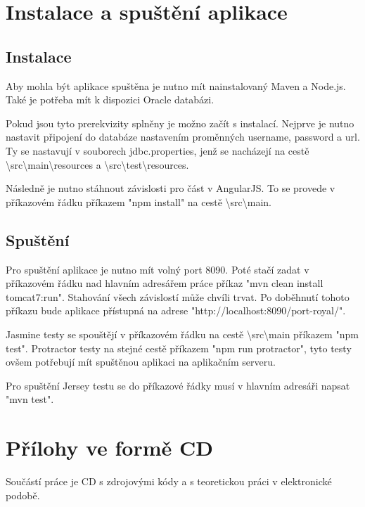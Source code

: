 \documentclass[czech,master,public,dept460,male,cpdeclaration,twoside]{diploma}
\begin{document}
\appendix
\section{Instalace a spuštění aplikace}

\subsection{Instalace}
Aby mohla být aplikace spuštěna je nutno mít nainstalovaný Maven a Node.js. Také je potřeba mít k dispozici Oracle databázi.

Pokud jsou tyto prerekvizity splněny je možno začít s instalací. Nejprve je nutno nastavit připojení do databáze nastavením proměnných username, password a url. Ty se nastavují v souborech jdbc.properties, jenž se nacházejí na cestě \textbackslash src\textbackslash main\textbackslash resources a \textbackslash src\textbackslash test\textbackslash resources.

Následně je nutno stáhnout závislosti pro část v AngularJS. To se provede v příkazovém řádku příkazem "npm install" na cestě \textbackslash src\textbackslash main.

\subsection{Spuštění}
Pro spuštění aplikace je nutno mít volný port 8090. Poté stačí zadat v příkazovém řádku nad hlavním adresářem práce příkaz "mvn clean install tomcat7:run". Stahování všech závislostí může chvíli trvat. Po doběhnutí tohoto příkazu bude aplikace přístupná na adrese "http://localhost:8090/port-royal/".

Jasmine testy se spouštějí v příkazovém řádku na cestě \textbackslash src\textbackslash main příkazem "npm test". Protractor testy na stejné cestě příkazem "npm run protractor", tyto testy ovšem potřebují mít spuštěnou aplikaci na aplikačním serveru.

Pro spuštění Jersey testu se do příkazové řádky musí v hlavním adresáři napsat "mvn test".

\section{Přílohy ve formě CD}
Součástí práce je CD s zdrojovými kódy a s teoretickou práci v elektronické podobě.
\end{document}
